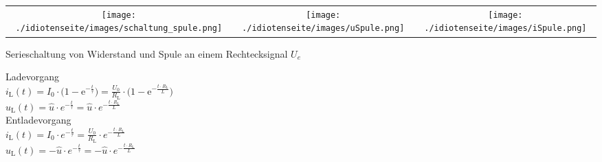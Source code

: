 \begin{tabular}{ccc} 
	\texttt{[image: ./idiotenseite/images/schaltung\_spule.png]} &
	\texttt{[image: ./idiotenseite/images/uSpule.png]} &
	\texttt{[image: ./idiotenseite/images/iSpule.png]}\\	
\end{tabular}
Serieschaltung von Widerstand und Spule an einem Rechtecksignal $U_e$
\begin{multicols}{2}
	Ladevorgang\\
	$i_{\mathrm{L}} (t) = I_0 \cdot \biggl(1 - \mathrm{e}^{-
	\frac{t}{\tau}}\biggr) = \frac{U_0}{R_{\mathrm{L}}} \cdot \biggl(1 -
	\mathrm{e}^{- \frac{t \cdot R_{\mathrm{L}}}{L}}\biggr)$\\
	$u_{\mathrm{L}} (t) = \hat u \cdot e^{- \frac{t}{\tau}} = \hat u \cdot e^{-
	\frac{t \cdot R_{\mathrm{L}}}{L}}$\\
	\newline
	Entladevorgang\\
	$i_{\mathrm{L}} (t) = I_0 \cdot e^{- \frac{t}{\tau}} =
	\frac{U_0}{R_{\mathrm{L}}} \cdot e^{- \frac{t \cdot
	R_{\mathrm{L}}}{L}}$\\
	$u_{\mathrm{L}} (t) = - \hat u \cdot e^{- \frac{t}{\tau}} = - \hat u \cdot
	e^{- \frac{t \cdot R_{\mathrm{L}}}{L}}$\\
\end{multicols}

